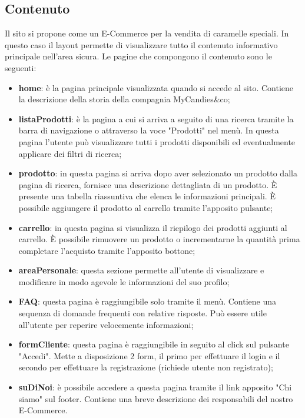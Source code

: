 \subsection{Contenuto}
Il sito si propone come un E-Commerce per la vendita di caramelle speciali. In questo caso il layout permette di visualizzare tutto il contenuto informativo principale nell'area sicura.
Le pagine che compongono il contenuto sono le seguenti:
\begin{itemize}
    \item \textbf{home}: è la pagina principale visualizzata quando si accede al sito. Contiene la descrizione della storia della compagnia MyCandies\&co;
    \item \textbf{listaProdotti}: è la pagina a cui si arriva a seguito di una ricerca tramite la barra di navigazione o attraverso la voce "Prodotti" nel menù. In questa pagina l'utente può visualizzare tutti i prodotti disponibili ed eventualmente applicare dei filtri di ricerca;
    \item \textbf{prodotto}: in questa pagina si arriva dopo aver selezionato un prodotto dalla pagina di ricerca, fornisce una descrizione dettagliata di un prodotto. È presente una tabella riassuntiva che elenca le informazioni principali. È possibile aggiungere il prodotto al carrello tramite l'apposito pulsante;
    \item \textbf{carrello}: in questa pagina si visualizza il riepilogo dei prodotti aggiunti al carrello. È possibile rimuovere un prodotto o incrementarne la quantità prima completare l'acquisto tramite l'apposito bottone;
    \item \textbf{areaPersonale}: questa sezione permette all'utente di visualizzare e modificare in modo agevole le informazioni del suo profilo;
    \item \textbf{FAQ}: questa pagina è raggiungibile solo tramite il menù. Contiene una sequenza di domande frequenti con relative risposte. Può essere utile all'utente per reperire velocemente informazioni;
    \item \textbf{formCliente}: questa pagina è raggiungibile in seguito al click sul pulsante "Accedi". Mette a disposizione 2 form, il primo per effettuare il login e il secondo per effettuare la registrazione (richiede utente non registrato);
    \item \textbf{suDiNoi}: è possibile accedere a questa pagina tramite il link apposito "Chi siamo" sul footer. Contiene una breve descrizione dei responsabili del nostro E-Commerce. 
\end{itemize}
